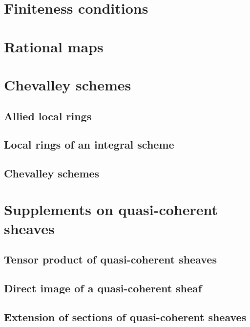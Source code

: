 \documentclass[10pt,oneside]{amsart}
\begin{document}
    \section{Finiteness conditions}

    \section{Rational maps}

    \section{Chevalley schemes}

        \subsection{Allied local rings}
        

        \subsection{Local rings of an integral scheme}
        

        \subsection{Chevalley schemes}
        

    \section{Supplements on quasi-coherent sheaves}

        \subsection{Tensor product of quasi-coherent sheaves}
        

        \subsection{Direct image of a quasi-coherent sheaf}
        
        
        \subsection{Extension of sections of quasi-coherent sheaves}
        
        
\end{document}
